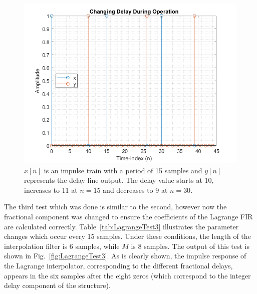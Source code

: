 \documentclass[../main.tex]{subfiles}
\begin{document}
\begin{figure}[h]
    \centering
    \includegraphics[scale=.65]{./images/plots/LagrangeTest2.png}
    \caption{$x[n]$ is an impulse train with a period of 15 samples and $y[n]$ represents the delay line output. The delay value starts at 10, increases to 11 at $n = 15$ and decreases to 9 at $n = 30$.}
    \label{fig:LagrangeTest2}
\end{figure}

The third test which was done is similar to the second, however now the fractional component was changed to ensure the coefficients of the Lagrange FIR are calculated correctly. Table~\ref{tab:LagrangeTest3} illustrates the parameter changes which occur every 15 samples. Under these conditions, the length of the interpolation filter is 6 samples, while $M$ is 8 samples. The output of this test is shown in Fig.~\ref{fig:LagrangeTest3}. As is clearly shown, the impulse response of the Lagrange interpolator, corresponding to the different fractional delays, appears in the six samples after the eight zeros (which correspond to the integer delay component of the structure).
\end{document}
